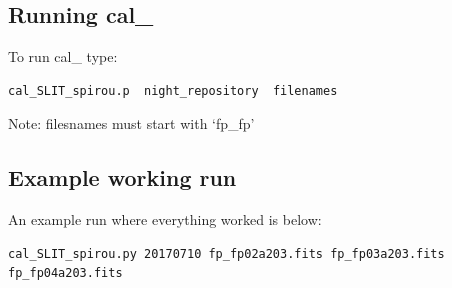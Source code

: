 \subsection{Running cal\_}
To run cal\_ type:
\begin{lstlisting}[language=bash, style=bashstyle]
cal_SLIT_spirou.p  night_repository  filenames
\end{lstlisting}

\noindent Note: filesnames must start with `fp\_fp'

\subsection{Example working run}

An example run where everything worked is below:

\begin{lstlisting}[style=text]
cal_SLIT_spirou.py 20170710 fp_fp02a203.fits fp_fp03a203.fits fp_fp04a203.fits


\end{lstlisting}
